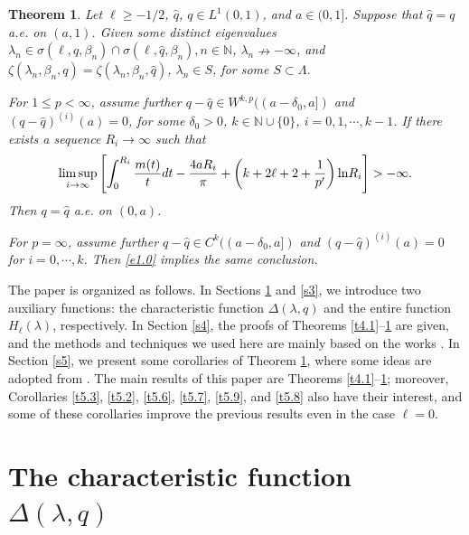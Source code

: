 \documentclass[reqno,12pt,centertags]{amsart}
\renewcommand{\ln}{\text{\rm ln}}
\numberwithin{equation}{section}
\newtheorem{theorem}{Theorem}[section]
\theoremstyle{definition}
\begin{document}
\begin{theorem}\label{t4.3}
Let $\ell\geq-1/2$, $\hat{q}$, $q\in L^{1}(0,1)$, and $a \in(0,1]$.
Suppose that $\hat{q}=q$ a.e. on $(a,1)$. Given some distinct eigenvalues $\lambda_n\in \sigma(\ell,q,\beta_{n})\cap\sigma(\ell,\hat{q},\beta_{n}), n\in\mathbb{N}$, $\lambda_{n}\nrightarrow -\infty$, and $\zeta(\lambda_{n},\beta_{n}, q)=\zeta(\lambda_{n},\beta_{n}, \hat{q})$, $\lambda_{n}\in S$, for some $S \subset \Lambda$.

For $1\leq p<\infty$, assume further $q-\hat{q} \in W^{k, p}((a-\delta_0, a])$ and $(q-\hat{q})^{(i)}(a)=0$, for some $\delta_0>0$, $k\in\mathbb{N}\cup\{0\}$, $i=0,1,\cdots, k-1$.  
If there exists a sequence $R_{i}\rightarrow\infty$ such that
\begin{align}\label{e1.0}
\limsup_{i \rightarrow \infty}
\left[\int_{0}^{R_{i}}\frac{m(t)}{t}dt
-\frac{4aR_{i}}{\pi}+\left(k+2\ell+2
+\frac{1}{p^{\prime}}\right) \ln R_{i}\right]
>-\infty.
\end{align}
Then $q=\hat{q}$ a.e. on $(0,a)$.

For $p=\infty$, assume further $q-\hat{q} \in C^{k}((a-\delta_0, a])$ and $(q-\hat{q})^{(i)}(a)=0$ for $i=0, \cdots, k$. Then \eqref{e1.0} implies the same conclusion.
\end{theorem}

The paper is organized as follows. 
In Sections \ref{s2} and \ref{s3}, we introduce two auxiliary functions: the characteristic function $\Delta(\lambda, q)$ and the entire function $H_{\ell}(\lambda)$, respectively. 
In Section \ref{s4}, the proofs of Theorems \ref{t4.1}--\ref{t4.3} are given, and the methods and techniques we used here are mainly based on the works \cite{Horv2005,HorvO2016,XYB2023}. 
In Section \ref{s5}, we present some corollaries of Theorem \ref{t4.3}, where some ideas are adopted from \cite{Hat2021}.
The main results of this paper are Theorems \ref{t4.1}--\ref{t4.3}; moreover, Corollaries \ref{t5.3}, \ref{t5.2}, \ref{t5.6}, \ref{t5.7}, \ref{t5.9}, and \ref{t5.8} also have their interest, and some of these corollaries improve the previous results even in the case $\ell=0$.

\section{The characteristic function $\Delta(\lambda,q)$}\label{s2}
\end{document}
